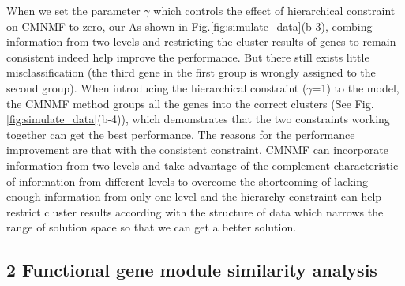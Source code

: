 \documentclass{bmcart}
\begin{document}
 When we set the parameter $\gamma$ which controls the effect of hierarchical constraint on CMNMF to zero, our  As shown in Fig.\ref{fig:simulate_data}(b-3), combing information from two levels and restricting the cluster results of genes to remain consistent indeed help improve the performance. But there still exists little misclassification (the third gene in the first group is wrongly assigned to the second group). When introducing the hierarchical constraint ($\gamma$=1) to the model, the CMNMF method groups all the genes into the correct clusters (See Fig.\ref{fig:simulate_data}(b-4)), which demonstrates that the two constraints working together can get the best performance. The reasons for the performance improvement are that with the consistent constraint, CMNMF can incorporate information from two levels and take advantage of the complement characteristic of information from different levels to overcome the shortcoming of lacking enough information from only one level and the hierarchy constraint can help restrict cluster results according with the structure of data which narrows the range of solution space so that we can get a better solution.

\subsection*{\textbf{2 Functional gene module similarity analysis}}
\end{document}

